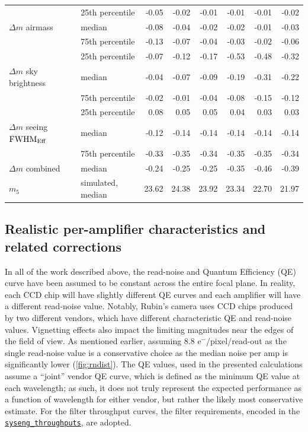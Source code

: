 \documentclass[PST,authoryear,toc]{lsstdoc}
\newcommand{\mf}{\ensuremath{m_5}}
\newcommand{\fwhme}{\ensuremath{{\rm FWHM}_\mathrm{Eff}}}
\begin{document}
\begin{table}
\begin{tabular}{llrrrrrr}
\hline
\hline
 &25th percentile       &   -0.05 &   -0.02 &   -0.01 &   -0.01 &   -0.01 &   -0.02 \\
$\Delta m$ airmass &median                &   -0.08 &   -0.04 &   -0.02 &   -0.02 &   -0.01 &   -0.03 \\
&75th percentile       &   -0.13 &   -0.07 &   -0.04 &   -0.03 &   -0.02 &   -0.06 \\
\hline
 &25th percentile &   -0.07 &   -0.12 &   -0.17 &   -0.53 &   -0.48 &   -0.32 \\
$\Delta m$ sky brightness& median          &   -0.04 &   -0.07 &   -0.09 &   -0.19 &   -0.31 &   -0.22 \\
 &75th percentile &   -0.02 &   -0.01 &   -0.04 &   -0.08 &   -0.15 &   -0.12 \\
\hline
&25th percentile &  0.08 &  0.05 &  0.05 &  0.04 &  0.03 &  0.03 \\
$\Delta m$ seeing \fwhme &median          &   -0.12 &   -0.14 &   -0.14 &   -0.14 &   -0.14 &   -0.14 \\
 &75th percentile &   -0.33 &   -0.35 &   -0.34 &   -0.35 &   -0.35 &   -0.34 \\
 \hline
 $\Delta m$ {combined} &median          &   -0.24 &   -0.25 &   -0.25 &   -0.35 &   -0.46 &   -0.39 \\

\hline
\hline
\mf\ & simulated, median                      &  23.62 &  24.38 &  23.92 &  23.34 &  22.70 &  21.97 \\
\hline

\hline
\end{tabular}
\end{table}

 
 \FloatBarrier


\subsection{Realistic per-amplifier characteristics and related corrections}\label{per-amp}
In all of the work described above, the read-noise and Quantum Efficiency (QE) curve have been assumed to be constant across the entire focal plane. In reality, each CCD chip will have slightly different QE curves and each amplifier will have a different read-noise value. Notably, Rubin's camera uses CCD chips produced by two different vendors, which have different characteristic QE and read-noise values. Vignetting effects also impact the limiting magnitudes near the edges of the field of view.  As mentioned earlier, assuming 8.8 e$^-$/pixel/read-out as the single read-noise value is a conservative choice as the median noise per amp is significantly lower (\autoref{fig:rndist}). The QE values, used in the presented calculations assume a ``joint'' vendor QE curve, which is defined as the minimum QE value at each wavelength; as such, it does not truly represent the expected performance as a function of wavelength for either vendor, but rather the likely most conservative estimate. For the filter throughput curves, the filter requirements, encoded in the \href{https://github.com/lsst-pst/syseng_throughputs}{{\tt syseng\_throughputs}}, are adopted.
\end{document}
